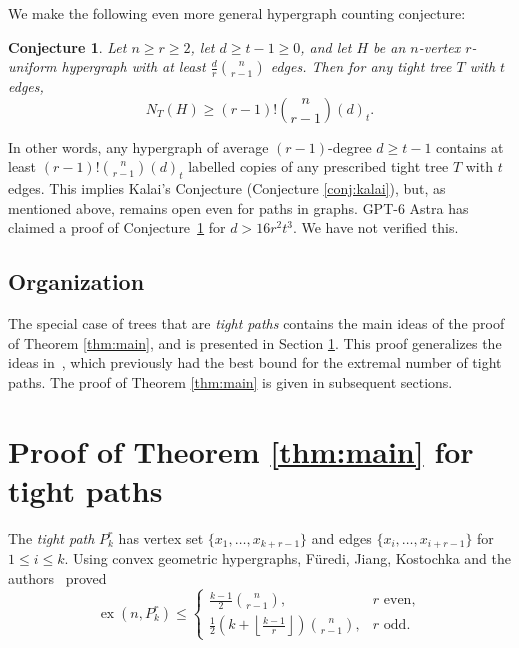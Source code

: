 \documentclass[11pt]{article}
\newtheorem{conjecture}{Conjecture}
\theoremstyle{remark}
\numberwithin{equation}{section}
\DeclareMathOperator{\ex}{ex}
\begin{document}
	
	
	We make the following 
	even more general hypergraph counting conjecture:
	
	\begin{conjecture} \label{conj:hypcount}
		Let $n \geq r \geq 2$, let $d \geq t - 1 \geq 0$, and let $H$ be an $n$-vertex $r$-uniform hypergraph with at least $\frac{d}{r}{n \choose r - 1}$ edges. Then for any tight tree $T$ with $t$ edges, 
		\begin{equation}
			N_T(H) \geq (r-1)!{n\choose r-1}(d)_t.
		\end{equation}    
	\end{conjecture}
	\bigskip
	
	In other words, any hypergraph of average $(r - 1)$-degree $d \geq t - 1$ contains at least $(r-1)!{n\choose r-1}(d)_t$ labelled copies of any prescribed tight tree $T$ with $t$ edges. This implies Kalai's Conjecture (Conjecture \ref{conj:kalai}), but, as mentioned above, remains open even for paths in graphs. GPT-6 Astra has claimed a proof of Conjecture~\ref{conj:hypcount} for $d>16r^2t^3$. We have not verified this. 
	
	\subsection{Organization} 
	
	The special case of trees that are {\em tight paths} contains the main ideas of the proof of Theorem \ref{thm:main}, and is presented in Section \ref{sec:paths}. 
	This proof generalizes the ideas in~\cite{FJKMVpaths}, which previously had the best bound for the extremal number of tight paths. The proof of Theorem \ref{thm:main} is given in subsequent sections.

	
	\section{Proof of Theorem \ref{thm:main} for tight paths}\label{sec:paths}
	
	The \emph{tight path} $P_k^r$ has vertex set
	$\{x_1,\ldots,x_{k+r-1}\}$ and edges
	$\{x_i,\ldots,x_{i+r-1}\}$ for $1\le i\le k$. Using convex geometric hypergraphs, F\"uredi, Jiang, Kostochka and the authors~\cite[Theorem 1.2]{FJKMVpaths} proved
	\begin{equation}\label{eq:previous-path}
		\ex(n,P_k^r)\le
		\begin{cases}
			\displaystyle\frac{k-1}{2}\binom{n}{r-1},&r\text{ even},\\[6pt]
			\displaystyle\frac12\left(k+\left\lfloor\frac{k-1}{r}\right\rfloor\right)
			\binom{n}{r-1},&r\text{ odd}.
		\end{cases}
	\end{equation}
	
\end{document}
